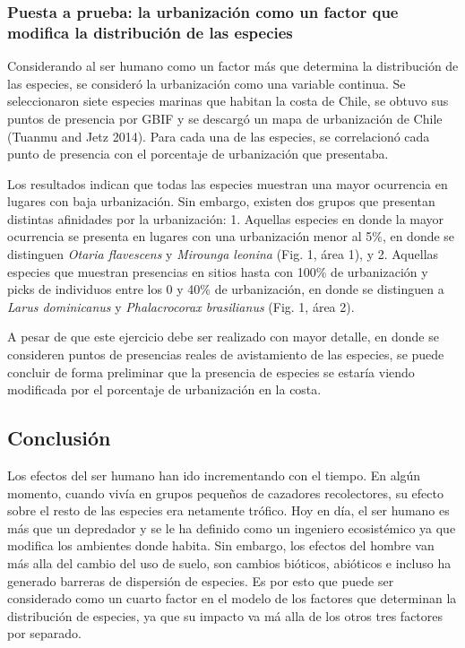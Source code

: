 \documentclass[]{article}
\begin{document}
\subsubsection{Puesta a prueba: la urbanización como un factor que
modifica la distribución de las
especies}\label{puesta-a-prueba-la-urbanizacion-como-un-factor-que-modifica-la-distribucion-de-las-especies}

Considerando al ser humano como un factor más que determina la
distribución de las especies, se consideró la urbanización como una
variable continua. Se seleccionaron siete especies marinas que habitan
la costa de Chile, se obtuvo sus puntos de presencia por GBIF y se
descargó un mapa de urbanización de Chile (Tuanmu and Jetz 2014). Para
cada una de las especies, se correlacionó cada punto de presencia con el
porcentaje de urbanización que presentaba.

Los resultados indican que todas las especies muestran una mayor
ocurrencia en lugares con baja urbanización. Sin embargo, existen dos
grupos que presentan distintas afinidades por la urbanización: 1.
Aquellas especies en donde la mayor ocurrencia se presenta en lugares
con una urbanización menor al 5\%, en donde se distinguen \emph{Otaria
flavescens} y \emph{Mirounga leonina} (Fig. 1, área 1), y 2. Aquellas
especies que muestran presencias en sitios hasta con 100\% de
urbanización y picks de individuos entre los 0 y 40\% de urbanización,
en donde se distinguen a \emph{Larus dominicanus} y \emph{Phalacrocorax
brasilianus} (Fig. 1, área 2).

A pesar de que este ejercicio debe ser realizado con mayor detalle, en
donde se consideren puntos de presencias reales de avistamiento de las
especies, se puede concluir de forma preliminar que la presencia de
especies se estaría viendo modificada por el porcentaje de urbanización
en la costa.

\subsection{Conclusión}\label{conclusion}

Los efectos del ser humano han ido incrementando con el tiempo. En algún
momento, cuando vivía en grupos pequeños de cazadores recolectores, su
efecto sobre el resto de las especies era netamente trófico. Hoy en día,
el ser humano es más que un depredador y se le ha definido como un
ingeniero ecosistémico ya que modifica los ambientes donde habita. Sin
embargo, los efectos del hombre van más alla del cambio del uso de
suelo, son cambios bióticos, abióticos e incluso ha generado barreras de
dispersión de especies. Es por esto que puede ser considerado como un
cuarto factor en el modelo de los factores que determinan la
distribución de especies, ya que su impacto va má alla de los otros tres
factores por separado.
\end{document}
